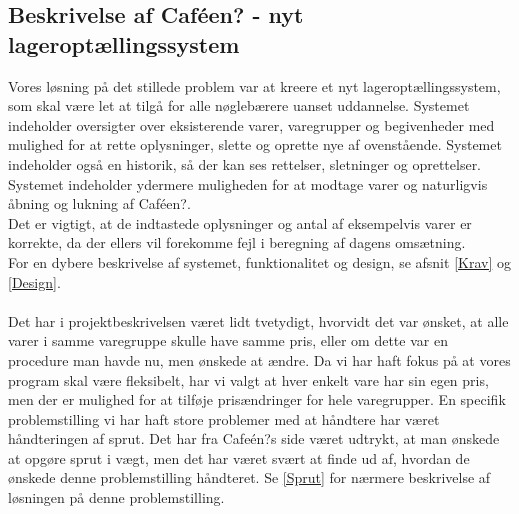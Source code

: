 \documentclass[]{article}
\begin{document}
\subsection{Beskrivelse af Caféen? - nyt lageroptællingssystem}
Vores løsning på det stillede problem var at kreere et nyt lageroptællingssystem, som skal være let at tilgå for alle nøglebærere uanset uddannelse. Systemet indeholder oversigter over eksisterende varer, varegrupper og begivenheder med mulighed for at rette oplysninger, slette og oprette nye af ovenstående. Systemet indeholder også en historik, så der kan ses rettelser, sletninger og oprettelser. Systemet indeholder ydermere muligheden for at modtage varer og naturligvis åbning og lukning af Caféen?. \\
Det er vigtigt, at de indtastede oplysninger og antal af eksempelvis varer er korrekte, da der ellers vil forekomme fejl i beregning af dagens omsætning. \\
For en dybere beskrivelse af systemet, funktionalitet og design, se afsnit \ref{Krav} og \ref{Design}. \\ \\
Det har i projektbeskrivelsen været lidt tvetydigt, hvorvidt det var ønsket, at alle varer i samme varegruppe skulle have samme pris, eller om dette var en procedure man havde nu, men ønskede at ændre. Da vi har haft fokus på at vores program skal være fleksibelt, har vi valgt at hver enkelt vare har sin egen pris, men der er mulighed for at tilføje prisændringer for hele varegrupper. En specifik problemstilling vi har haft store problemer med at håndtere har været håndteringen af sprut. Det har fra Cafeén?s side været udtrykt, at man ønskede at opgøre sprut i vægt, men det har været svært at finde ud af, hvordan de ønskede denne problemstilling håndteret. Se \ref{Sprut} for nærmere beskrivelse af løsningen på denne problemstilling.
\end{document}
